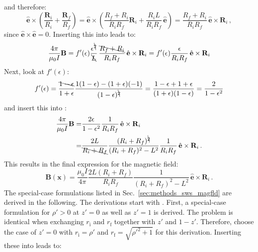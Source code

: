and therefore:
\begin{equation}
   \hat{\mathbf{e}} \times \left( \frac{\mathbf{R}_i}{R_i} + \frac{\mathbf{R}_f}{R_f} \right)
 = \hat{\mathbf{e}} \times \left( \frac{R_f+R_i}{R_i R_f} \mathbf{R}_i + \frac{R_i L}{R_i R_f} \, \hat{\mathbf{e}} \right)
 = \frac{R_f+R_i}{R_i R_f} \, \hat{\mathbf{e}} \times \mathbf{R}_i \, ,
\end{equation}
since $\hat{\mathbf{e}} \times \hat{\mathbf{e}} = 0$.
Inserting this into  leads to:
\begin{equation}
   \frac{4 \pi}{\mu_0 I} \mathbf{B}
 = f'(\epsilon) \frac{\epsilon^{\bcancel{2}}}{\bcancel{L}} \, \frac{\bcancel{R_f+R_i}}{R_i R_f} \, \hat{\mathbf{e}} \times \mathbf{R}_i
 = f'(\epsilon) \frac{\epsilon}{R_i R_f} \, \hat{\mathbf{e}} \times \mathbf{R}_i \label{eqn:B_intermediate_2}
\end{equation}
Next, look at $f'(\epsilon)$:
\begin{equation}
   f'(\epsilon)
 = \frac{\bcancel{1 - \epsilon}}{1 + \epsilon} \frac{1 (1-\epsilon) - (1+\epsilon) (-1)}{(1 - \epsilon)^{\bcancel{2}}}
 = \frac{1 - \epsilon + 1 + \epsilon}{(1 + \epsilon)(1 - \epsilon)}
 = \frac{2}{1 - \epsilon^2}
\end{equation}
and insert this into :
\begin{align}
   \frac{4 \pi}{\mu_0 I} \mathbf{B}
 = & \frac{2 \epsilon}{1 - \epsilon^2} \frac{1}{R_i R_f} \, \hat{\mathbf{e}} \times \mathbf{R}_i \\
 = & \frac{2 L}{\bcancel{R_i + R_f}} \frac{(R_i + R_f)^{\bcancel{2}}}{(R_i + R_f)^2 - L^2} \frac{1}{R_i R_f} \, \hat{\mathbf{e}} \times \mathbf{R}_i \, .
\end{align}
This results in the final expression for the magnetic field:
\begin{equation}
 \mathbf{B} (\mathbf{x}) = \frac{\mu_0 I}{4 \pi} \frac{2 L (R_i + R_f)}{R_i R_f} \frac{1}{(R_i + R_f)^2 - L^2} \, \hat{\mathbf{e}} \times \mathbf{R}_i \, .
\end{equation}
The special-case formulations listed in Sec.~\ref{sec:methods_sws_magfld} are derived in the following.
The derivations start with .
First, a special-case formulation for $\rho' > 0$ at $z'=0$ as well as $z'=1$ is derived.
The problem is identical when exchanging $r_\mathrm{i}$ and $r_\mathrm{f}$ together with $z'$ and $1-z'$.
Therefore, choose the case of $z'=0$ with $r_\mathrm{i} = \rho'$ and $r_\mathrm{f} = \sqrt{{\rho'}^2+1}$
for this derivation.
Inserting these into  leads to:
